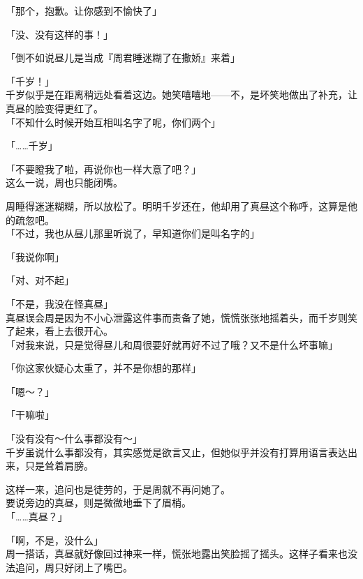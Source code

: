 「那个，抱歉。让你感到不愉快了」

「没、没有这样的事！」

「倒不如说昼儿是当成『周君睡迷糊了在撒娇』来着」

「千岁！」\\

千岁似乎是在距离稍远处看着这边。她笑嘻嘻地——不，是坏笑地做出了补充，让真昼的脸变得更红了。\\

「不知什么时候开始互相叫名字了呢，你们两个」

「……千岁」

「不要瞪我了啦，再说你也一样大意了吧？」\\

这么一说，周也只能闭嘴。

周睡得迷迷糊糊，所以放松了。明明千岁还在，他却用了真昼这个称呼，这算是他的疏忽吧。\\

「不过，我也从昼儿那里听说了，早知道你们是叫名字的」

「我说你啊」

「对、对不起」

「不是，我没在怪真昼」\\

真昼误会周是因为不小心泄露这件事而责备了她，慌慌张张地摇着头，而千岁则笑了起来，看上去很开心。\\

「对我来说，只是觉得昼儿和周很要好就再好不过了哦？又不是什么坏事嘛」

「你这家伙疑心太重了，并不是你想的那样」

「嗯～？」

「干嘛啦」

「没有没有～什么事都没有～」\\

千岁虽说什么事都没有，其实感觉是欲言又止，但她似乎并没有打算用语言表达出来，只是耸着肩膀。

这样一来，追问也是徒劳的，于是周就不再问她了。\\

要说旁边的真昼，则是微微地垂下了眉梢。\\

「……真昼？」

「啊，不是，没什么」\\

周一搭话，真昼就好像回过神来一样，慌张地露出笑脸摇了摇头。这样子看来也没法追问，周只好闭上了嘴巴。\\

